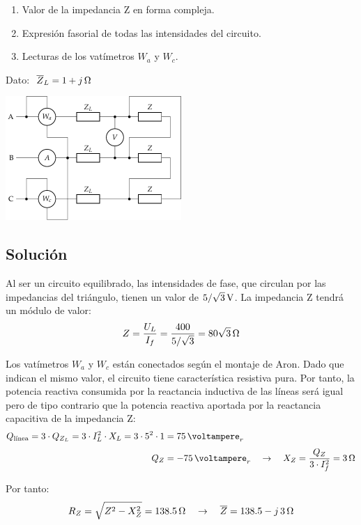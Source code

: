 \begin{enumerate}
\item Valor de la impedancia Z en forma compleja.
\item Expresión fasorial de todas las intensidades del circuito.
\item Lecturas de los vatímetros $W_a$ y $W_c$.
\end{enumerate}

Dato: $\; \overline{Z}_L = \SI[parse-numbers = false]{1 + j}{\ohm}$

\begin{center}
  \includegraphics[width = 0.5\textwidth]{figuras/BT3_12}
\end{center}


\subsection*{Solución}

Al ser un circuito equilibrado, las intensidades de fase, que
circulan por las impedancias del triángulo, tienen un valor de
$\SI[parse-numbers=false]{5/\sqrt{3}}{\volt}$. La impedancia Z
tendrá un módulo de valor:
\[
  Z = \frac{U_L}{I_f} = \frac{400}{5/\sqrt{3}} =
  \SI[parse-numbers=false]{80\sqrt{3}}{\ohm}
\]

Los vatímetros $W_a$ y $W_c$ están conectados según el montaje de Aron. Dado que indican el mismo valor, el
circuito tiene característica resistiva pura. Por tanto, la
potencia reactiva consumida por la reactancia inductiva de las
líneas será igual pero de tipo contrario que la potencia reactiva
aportada por la reactancia capacitiva de la impedancia Z:
\begin{align*}
  Q_{\textrm{línea}} = 3 \cdot Q_{Z_L} = 3 \cdot I_L^2 \cdot X_L = 3 \cdot 5^2 \cdot 1 &= \SI{75}{\voltampere}_r\\[3pt]
  Q_Z &= -\SI{75}{\voltampere}_r \quad\rightarrow\quad
  X_Z = \dfrac{Q_Z}{3\cdot I_f^2} = \SI{3}{\ohm}
\end{align*}

Por tanto:
\[
  R_Z = \sqrt{Z^2 - X_Z^2} = \SI{138.5}{\ohm} \quad\rightarrow\quad \overline{Z} = \SI[parse-numbers=false]{138.5 - j\,3}{\ohm}
\]

